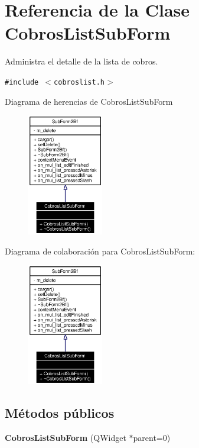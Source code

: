 \section{Referencia de la Clase Cobros\-List\-Sub\-Form}
\label{classCobrosListSubForm}
Administra el detalle de la lista de cobros.  


{\tt \#include $<$cobroslist.h$>$}

Diagrama de herencias de Cobros\-List\-Sub\-Form\begin{figure}[H]
\begin{center}
\leavevmode
\includegraphics[width=94pt]{classCobrosListSubForm__inherit__graph}
\end{center}
\end{figure}
Diagrama de colaboraci\'{o}n para Cobros\-List\-Sub\-Form:\begin{figure}[H]
\begin{center}
\leavevmode
\includegraphics[width=94pt]{classCobrosListSubForm__coll__graph}
\end{center}
\end{figure}
\subsection*{M\'{e}todos p\'{u}blicos}
\begin{CompactItemize}
\item 
{\bf Cobros\-List\-Sub\-Form} (QWidget $\ast$parent=0)
\end{CompactItemize}


